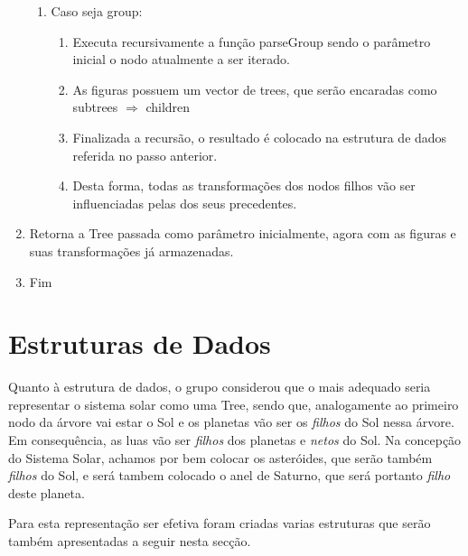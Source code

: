 \documentclass[a4paper]{article}
\begin{document}
\begin{enumerate}
\begin{enumerate}
    \item Caso seja group:
      \begin{enumerate}
        \item Executa recursivamente a função parseGroup sendo o parâmetro inicial o nodo atualmente a ser iterado.
        \item As figuras possuem um vector de trees, que serão encaradas como subtrees $\Rightarrow$ children
        \item Finalizada a recursão, o resultado é colocado na estrutura de dados referida no passo anterior.
        \item Desta forma, todas as transformações dos nodos filhos vão ser influenciadas pelas dos seus precedentes.
      \end{enumerate}

  \end{enumerate}

  \item Retorna a Tree passada como parâmetro inicialmente, agora com as figuras e suas transformações já armazenadas.
  \item Fim
\end{enumerate}
\rmfamily


\newpage

\section{Estruturas de Dados}
\label{sec:estruturas}
Quanto à estrutura de dados, o grupo considerou que o mais adequado seria representar o sistema solar como uma Tree, sendo que, analogamente ao primeiro nodo da árvore vai estar o Sol e os planetas vão ser os \textit{filhos} do Sol nessa árvore. Em consequência, as luas vão ser \textit{filhos} dos planetas e \textit{netos} do Sol. Na concepção do Sistema Solar, achamos por bem colocar os asteróides, que serão também \textit{filhos} do Sol, e será tambem colocado o anel de Saturno, que será portanto \textit{filho} deste planeta.

Para esta representação ser efetiva foram criadas varias estruturas que serão também apresentadas a seguir nesta secção.

\vspace{0.3cm}
\end{document}
